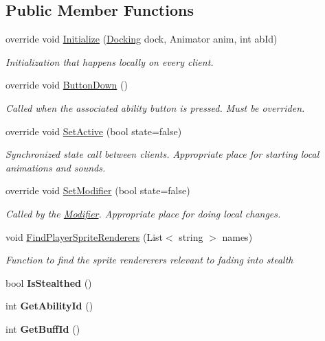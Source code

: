 \subsection*{Public Member Functions}
\begin{DoxyCompactItemize}
\item 
override void \hyperlink{class_stealth_a3483f2663cee9ce06b7a6cd2675b6fc9}{Initialize} (\hyperlink{class_docking}{Docking} dock, Animator anim, int ab\+Id)
\begin{DoxyCompactList}\small\item\em Initialization that happens locally on every client. \end{DoxyCompactList}\item 
override void \hyperlink{class_stealth_aae7d450018e62c03c909694ceef22511}{Button\+Down} ()
\begin{DoxyCompactList}\small\item\em Called when the associated ability button is pressed. Must be overriden. \end{DoxyCompactList}\item 
override void \hyperlink{class_stealth_a90167c557e62b3cc2a0a0d5c2c57720e}{Set\+Active} (bool state=false)
\begin{DoxyCompactList}\small\item\em Synchronized state call between clients. Appropriate place for starting local animations and sounds. \end{DoxyCompactList}\item 
override void \hyperlink{class_stealth_a2f3bf9001b860f4b3935a83d8b085f63}{Set\+Modifier} (bool state=false)
\begin{DoxyCompactList}\small\item\em Called by the \hyperlink{class_modifier}{Modifier}. Appropriate place for doing local changes. \end{DoxyCompactList}\item 
void \hyperlink{class_stealth_a94c470c41f796ad0079ae50f82f76fe5}{Find\+Player\+Sprite\+Renderers} (List$<$ string $>$ names)
\begin{DoxyCompactList}\small\item\em Function to find the sprite rendererers relevant to fading into stealth \end{DoxyCompactList}\item 
\hypertarget{class_stealth_a3e3c0e9e57052078b7c92bc63467a0d9}{}\label{class_stealth_a3e3c0e9e57052078b7c92bc63467a0d9} 
bool {\bfseries Is\+Stealthed} ()
\item 
\hypertarget{class_stealth_a75c971c5acc0c848c5b88ece435a1b8f}{}\label{class_stealth_a75c971c5acc0c848c5b88ece435a1b8f} 
int {\bfseries Get\+Ability\+Id} ()
\item 
\hypertarget{class_stealth_a4a73443083ee4e4a3d9e426e83e2664f}{}\label{class_stealth_a4a73443083ee4e4a3d9e426e83e2664f} 
int {\bfseries Get\+Buff\+Id} ()
\end{DoxyCompactItemize}
